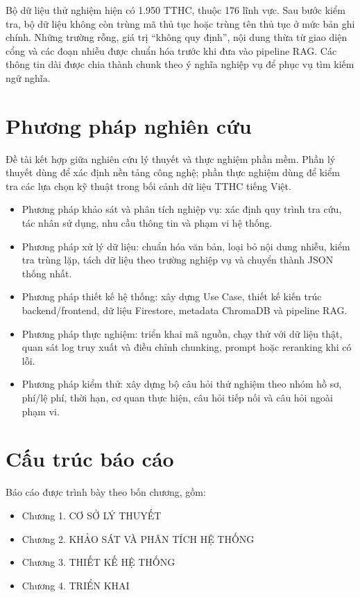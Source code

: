 Bộ dữ liệu thử nghiệm hiện có 1.950 TTHC, thuộc 176 lĩnh vực. Sau bước
kiểm tra, bộ dữ liệu không còn trùng mã thủ tục hoặc trùng tên thủ tục ở
mức bản ghi chính. Những trường rỗng, giá trị ``không quy định'', nội
dung thừa từ giao diện cổng và các đoạn nhiễu được chuẩn hóa trước khi
đưa vào pipeline RAG. Các thông tin dài được chia thành chunk theo ý
nghĩa nghiệp vụ để phục vụ tìm kiếm ngữ nghĩa.

\section*{Phương pháp nghiên
cứu}

Đề tài kết hợp giữa nghiên cứu lý thuyết và thực nghiệm phần mềm. Phần
lý thuyết dùng để xác định nền tảng công nghệ; phần thực nghiệm dùng để
kiểm tra các lựa chọn kỹ thuật trong bối cảnh dữ liệu TTHC tiếng Việt.

\begin{itemize}
\item
  Phương pháp khảo sát và phân tích nghiệp vụ: xác định quy trình tra
  cứu, tác nhân sử dụng, nhu cầu thông tin và phạm vi hệ thống.
\item
  Phương pháp xử lý dữ liệu: chuẩn hóa văn bản, loại bỏ nội dung nhiễu,
  kiểm tra trùng lặp, tách dữ liệu theo trường nghiệp vụ và chuyển thành
  JSON thống nhất.
\item
  Phương pháp thiết kế hệ thống: xây dựng Use Case, thiết kế kiến trúc
  backend/frontend, dữ liệu Firestore, metadata ChromaDB và pipeline
  RAG.
\item
  Phương pháp thực nghiệm: triển khai mã nguồn, chạy thử với dữ liệu
  thật, quan sát log truy xuất và điều chỉnh chunking, prompt hoặc
  reranking khi có lỗi.
\item
  Phương pháp kiểm thử: xây dựng bộ câu hỏi thử nghiệm theo nhóm hồ sơ,
  phí/lệ phí, thời hạn, cơ quan thực hiện, câu hỏi tiếp nối và câu hỏi
  ngoài phạm vi.
\end{itemize}

\section*{Cấu trúc báo
cáo}

Báo cáo được trình bày theo bốn chương, gồm:

\begin{itemize}
\item
  Chương 1. CƠ SỞ LÝ THUYẾT
\item
  Chương 2. KHẢO SÁT VÀ PHÂN TÍCH HỆ THỐNG
\item
  Chương 3. THIẾT KẾ HỆ THỐNG
\item
  Chương 4. TRIỂN KHAI
\end{itemize}
